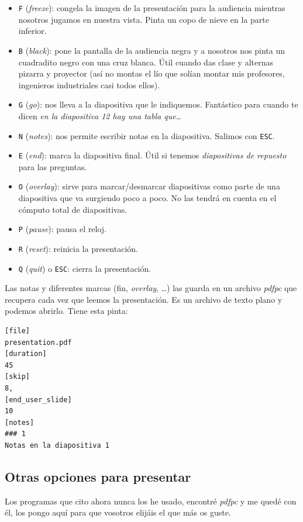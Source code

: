 \begin{itemize}
\item
  \lstinline!F! (\emph{freeze}): congela la imagen de la presentación
  para la audiencia mientras nosotros jugamos en nuestra vista. Pinta un
  copo de nieve en la parte inferior.
\item
  \lstinline!B! (\emph{black}): pone la pantalla de la audiencia negra y
  a nosotros nos pinta un cuadradito negro con una cruz blanca. Útil
  cuando das clase y alternas pizarra y proyector (así no montas el lío
  que solían montar mis profesores, ingenieros industriales casi todos
  ellos).
\item
  \lstinline!G! (\emph{go}): nos lleva a la diapositiva que le
  indiquemos. Fantástico para cuando te dicen \emph{en la diapositiva 12
  hay una tabla que\ldots{}}
\item
  \lstinline!N! (\emph{notes}): nos permite escribir notas en la
  diapositiva. Salimos con \lstinline!ESC!.
\item
  \lstinline!E! (\emph{end}): marca la diapositiva final. Útil si
  tenemos \emph{diapositivas de repuesto} para las preguntas.
\item
  \lstinline!O! (\emph{overlay}): sirve para marcar/desmarcar
  diapositivas como parte de una diapositiva que va surgiendo poco a
  poco. No las tendrá en cuenta en el cómputo total de diapositivas.
\item
  \lstinline!P! (\emph{pause}): pausa el reloj.
\item
  \lstinline!R! (\emph{reset}): reinicia la presentación.
\item
  \lstinline!Q! (\emph{quit}) o \lstinline!ESC!: cierra la presentación.
\end{itemize}

Las notas y diferentes marcas (fin, \emph{overlay}, \ldots{}) las guarda
en un archivo \emph{pdfpc} que recupera cada vez que leemos la
presentación. Es un archivo de texto plano y podemos abrirlo. Tiene esta
pinta:

\begin{lstlisting}
[file]
presentation.pdf
[duration]
45
[skip]
8,
[end_user_slide]
10
[notes]
### 1
Notas en la diapositiva 1
\end{lstlisting}

\subsection{Otras opciones para
presentar}

Los programas que cito ahora nunca los he usado, encontré \emph{pdfpc} y
me quedé con él, los pongo aquí para que vosotros elijáis el que más os
guste.

